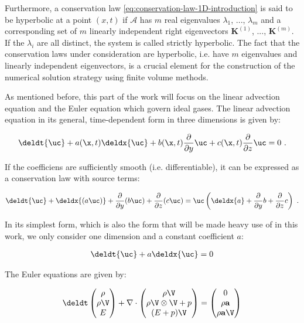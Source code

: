 Furthermore, a conservation law \ref{eq:conservation-law-1D-introduction} is said to be hyperbolic
at a point $(x, t)$ if $\mathcal{A}$ has $m$ real eigenvalues $\lambda_1$, ..., $\lambda_m$ and a
corresponding set of $m$ linearly independent right eigenvectors $\mathbf{K}^{(1)}$, ...,
$\mathbf{K}^{(m)}$. If the $\lambda_i$ are all distinct, the system is called strictly hyperbolic.
The fact that the conservation laws under consideration are hyperbolic, i.e. have $m$ eigenvalues
and linearly independent eigenvectors, is a crucial element for the construction of the numerical
solution strategy using finite volume methods.




As mentioned before, this part of the work will focus on the linear advection equation and the
Euler equation which govern ideal gases. The linear advection equation in its general,
time-dependent form in three dimensions is given by:

\begin{align}
  \deldt{\uc} +
    a(\x, t) \deldx{\uc} +
    b(\x, t) \frac{\partial}{\partial y} \uc +
    c(\x, t) \frac{\partial}{\partial z} \uc
    = 0 \ .
    \label{eq:linear-advection-general}
\end{align}

If the coefficiens are sufficiently smooth (i.e. differentiable), it can be expressed as a
conservation law with source terms:

\begin{align}
  \deldt{\uc} +
    \deldx{(a \uc)} +
    \frac{\partial}{\partial y} (b\uc) +
    \frac{\partial}{\partial z} (c \uc )
    = \uc \left(
    \deldx{a} +
    \frac{\partial}{\partial y} b +
    \frac{\partial}{\partial z} c
    \right) \ .
\end{align}

In its simplest form, which is also the form that will be made heavy use of in this work, we only
consider one dimension and a constant coefficient $a$:

\begin{align}
    \deldt{\uc} + a \deldx{\uc} = 0 \label{eq:linear-advection-1D-const-coeff}
\end{align}



The Euler equations are given by:


\begin{align}
	\deldt
	\begin{pmatrix}
		\rho \\
		\rho \V \\
		E
	\end{pmatrix}
	+
	\nabla \cdot
	\begin{pmatrix}
		\rho \V\\
		\rho \V \otimes \V + p\\
		(E + p) \V
	\end{pmatrix}
	=
	\begin{pmatrix}
		0\\
		\rho \mathbf{a}\\
		\rho \mathbf{a} \V
	\end{pmatrix}
	\label{eq:euler-equations}
\end{align}



